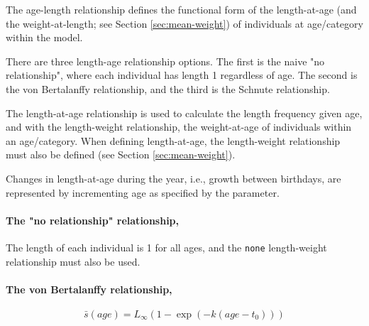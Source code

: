 The age-length relationship defines the functional form of the length-at-age (and the weight-at-length; see Section \ref{sec:mean-weight}) of individuals at age/category within the model.

There are three length-age relationship options. The first is the naive "no relationship", where each individual has length 1 regardless of age. The second is the von Bertalanffy relationship, and the third is the Schnute relationship.

The length-at-age relationship is used to calculate the length frequency given age, and with the length-weight relationship, the weight-at-age of individuals within an age/category. When defining length-at-age, the length-weight relationship must also be defined (see Section \ref{sec:mean-weight}).

Changes in length-at-age during the year, i.e., growth between birthdays, are represented by incrementing age as specified by the  parameter.


\paragraph[None]{The "no relationship" relationship, }

The length of each individual is 1 for all ages, and the \texttt{none} length-weight relationship must also be used.

\paragraph[von Bertalanffy]{The von Bertalanffy relationship, }

\begin{equation}
\bar{s}(age)= L_\infty \left( 1 - \exp \left( -k \left(age-t_0 \right) \right) \right)
\end{equation}

